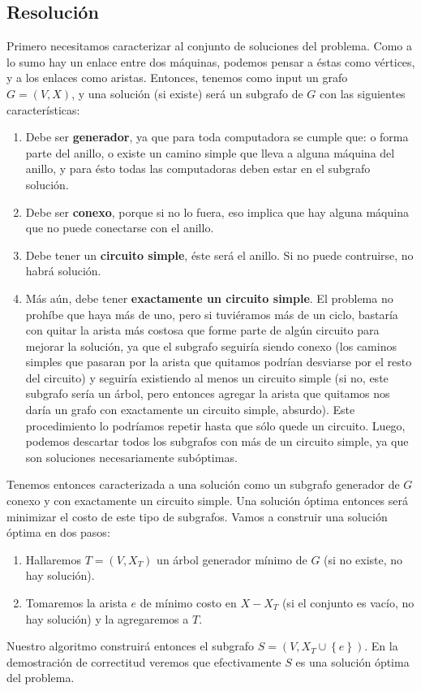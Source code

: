 \subsection{Resolución}

Primero necesitamos caracterizar al conjunto de soluciones del problema. Como a lo sumo hay un enlace entre dos máquinas, podemos pensar a éstas como vértices, y a los enlaces como aristas. Entonces, tenemos como input un grafo $G = (V,X)$, y una solución (si existe) será un subgrafo de $G$ con las siguientes características:
\begin{enumerate}
    \item Debe ser \textbf{generador}, ya que para toda computadora se cumple que: o forma parte del anillo, o existe un camino simple que lleva a alguna máquina del anillo, y para ésto todas las computadoras deben estar en el subgrafo solución.
    \item Debe ser \textbf{conexo}, porque si no lo fuera, eso implica que hay alguna máquina que no puede conectarse con el anillo.
    \item Debe tener un \textbf{circuito simple}, éste será el anillo. Si no puede contruirse, no habrá solución.
    \item Más aún, debe tener \textbf{exactamente un circuito simple}. El problema no prohíbe que haya más de uno, pero si tuviéramos más de un ciclo, bastaría con quitar la arista más costosa que forme parte de algún circuito para mejorar la solución, ya que el subgrafo seguiría siendo conexo (los caminos simples que pasaran por la arista que quitamos podrían desviarse por el resto del circuito) y seguiría existiendo al menos un circuito simple (si no, este subgrafo sería un árbol, pero entonces agregar la arista que quitamos nos daría un grafo con exactamente un circuito simple, absurdo). Este procedimiento lo podríamos repetir hasta que sólo quede un circuito. Luego, podemos descartar todos los subgrafos con más de un circuito simple, ya que son soluciones necesariamente subóptimas.
\end{enumerate}
Tenemos entonces caracterizada a una solución como un subgrafo generador de $G$ conexo y con exactamente un circuito simple. Una solución óptima entonces será minimizar el costo de este tipo de subgrafos. Vamos a construir una solución óptima en dos pasos:
\begin{enumerate}
 \item Hallaremos $T = (V, X_T)$ un árbol generador mínimo de $G$ (si no existe, no hay solución).
 \item Tomaremos la arista $e$ de mínimo costo en $X - X_T$ (si el conjunto es vacío, no hay solución) y la agregaremos a $T$.
\end{enumerate}
Nuestro algoritmo construirá entonces el subgrafo $S = (V, X_T \cup \left\{e\right\})$. En la demostración de correctitud veremos que efectivamente $S$ es una solución óptima del problema.


